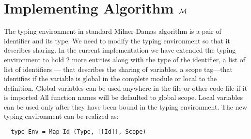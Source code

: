 
\section{Implementing Algorithm $\mathcal{M}$}
The typing environment in standard Milner-Damas algorithm
is a pair of identifier and its type.
We need to modify the typing environment so that it describes sharing.
In the current implementation we have
extended the typing environment to hold 2 more entities along with the
type of the identifier, a list of list of identifiers --- that describes the sharing of variables,
a scope tag---that identifies if the variable is global in the complete module or local to the definition.
Global variables can be used anywhere in the file or other code file if it is imported
All function names will be defaulted to global scope.
Local variables can be used only after they have been bound in the typing environment.
The new typing environment can be realized as:
\begin{verbatim}
  type Env = Map Id (Type, [[Id]], Scope)
\end{verbatim}




